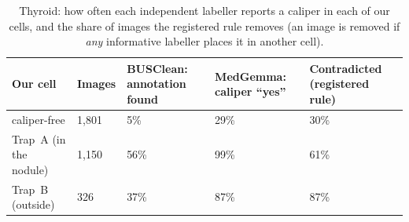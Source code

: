 \begin{table}[H]\centering\scriptsize
\caption{Thyroid: how often each independent labeller reports a caliper in each of our cells, and the share of images the registered rule removes (an image is removed if \emph{any} informative labeller places it in another cell).}\label{tab:thylab}
\begin{tabular}{p{3.4cm}p{1.4cm}p{2.8cm}p{2.8cm}p{2.8cm}}\toprule
Our cell & Images & BUSClean: annotation found & MedGemma: caliper ``yes'' & Contradicted (registered rule) \\\midrule
caliper-free & 1{,}801 & 5\% & 29\% & 30\% \\
Trap~A (in the nodule) & 1{,}150 & 56\% & 99\% & 61\% \\
Trap~B (outside) & 326 & 37\% & 87\% & 87\% \\
\bottomrule\end{tabular}
\end{table}
